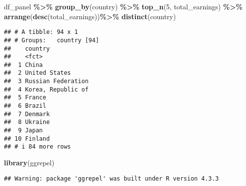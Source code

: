 \documentclass[
]{article}
\newenvironment{Shaded}{\begin{snugshade}}{\end{snugshade}}
\newcommand{\DecValTok}[1]{\textcolor[rgb]{0.00,0.00,0.81}{#1}}
\newcommand{\FunctionTok}[1]{\textcolor[rgb]{0.13,0.29,0.53}{\textbf{#1}}}
\newcommand{\NormalTok}[1]{#1}
\newcommand{\SpecialCharTok}[1]{\textcolor[rgb]{0.81,0.36,0.00}{\textbf{#1}}}
\begin{document}
\begin{Shaded}
\begin{Highlighting}[]
\NormalTok{ df\_panel }\SpecialCharTok{\%\textgreater{}\%}
  \FunctionTok{group\_by}\NormalTok{(country) }\SpecialCharTok{\%\textgreater{}\%}
  \FunctionTok{top\_n}\NormalTok{(}\DecValTok{5}\NormalTok{, total\_earnings) }\SpecialCharTok{\%\textgreater{}\%}
  \FunctionTok{arrange}\NormalTok{(}\FunctionTok{desc}\NormalTok{(total\_earnings))}\SpecialCharTok{\%\textgreater{}\%}
  \FunctionTok{distinct}\NormalTok{(country)}
\end{Highlighting}
\end{Shaded}

\begin{verbatim}
## # A tibble: 94 x 1
## # Groups:   country [94]
##    country           
##    <fct>             
##  1 China             
##  2 United States     
##  3 Russian Federation
##  4 Korea, Republic of
##  5 France            
##  6 Brazil            
##  7 Denmark           
##  8 Ukraine           
##  9 Japan             
## 10 Finland           
## # i 84 more rows
\end{verbatim}

\begin{Shaded}
\begin{Highlighting}[]
\FunctionTok{library}\NormalTok{(ggrepel) }
\end{Highlighting}
\end{Shaded}

\begin{verbatim}
## Warning: package 'ggrepel' was built under R version 4.3.3
\end{verbatim}
\end{document}
